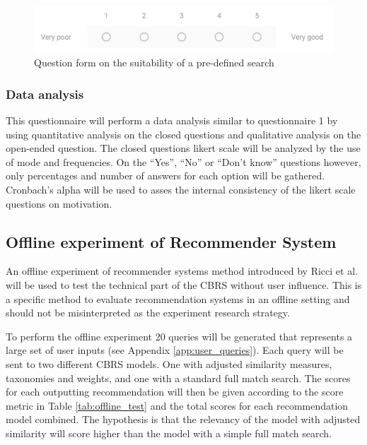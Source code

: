 \begin{figure}[H]
    \centering
    \includegraphics[width=1\textwidth]{fig/rate_search.png}
    \caption{Question form on the suitability of a pre-defined search}
    \label{fig:q2_rate_search}
\end{figure}


\subsubsection{Data analysis}
This questionnaire will perform a data analysis similar to questionnaire 1 by using quantitative analysis on the closed questions and qualitative analysis on the open-ended question. The closed questions likert scale will be analyzed by the use of mode and frequencies. On the \enquote{Yes}, \enquote{No} or \enquote{Don't know} questions however, only percentages and number of answers for each option will be gathered. Cronbach's alpha will be used to asses the internal consistency of the likert scale questions on motivation. 

\subsection{Offline experiment of Recommender System}\label{sec:observation_test}
An offline experiment of recommender systems method introduced by Ricci et al.\cite{ricci2011introduction} will be used to test the technical part of the CBRS without user influence. This is a specific method to evaluate recommendation systems in an offline setting and should not be misinterpreted as the experiment research strategy.

To perform the offline experiment 20 queries will be generated that represents a large set of user inputs (see Appendix \ref{app:user_queries}). Each query will be sent to two different CBRS models. One with adjusted similarity measures, taxonomies and weights, and one with a standard full match search. The scores for each outputting recommendation will then be given according to the score metric in Table \ref{tab:offline_test} and the total scores for each recommendation model combined. The hypothesis is that the relevancy of the model with adjusted similarity will score higher than the model with a simple full match search. 

